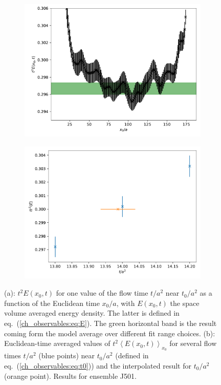 \begin{figure}
    \begin{subfigure}{.49\textwidth}
    	\includegraphics[width=\textwidth]{./cap3/figs/J501_t2E.pdf}
    	\caption{}
    \end{subfigure}
    \begin{subfigure}{.49\textwidth}
    	\includegraphics[width=\textwidth]{./cap3/figs/t0_J501.pdf}
    	\caption{}
    \end{subfigure}
    \caption{(a): $t^2E(x_0,t)$ for one value of the flow time $t/a^2$ near $t_0/a^2$ as a function of the Euclidean time $x_0/a$, with $E(x_0,t)$ the space volume averaged energy density. The latter is defined in eq.~(\ref{ch_observables:eq:E}). The green horizontal band is the result coming form the model average over different fit range choices. (b): Euclidean-time averaged values of $t^2\left<E(x_0,t)\right>_{x_0}$ for several flow times $t/a^2$ (blue points) near $t_0/a^2$ (defined in eq.~(\ref{ch_observables:eq:t0})) and the interpolated result for $t_0/a^2$ (orange point). Results for ensemble J501.}
        \label{ch_observables:fig:t2E}
\end{figure}

